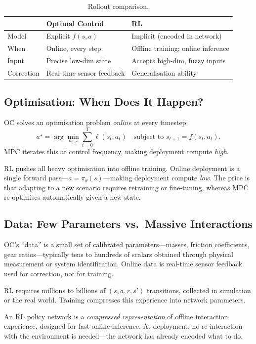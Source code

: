 \begin{table}[htbp]
\centering
\caption{Rollout comparison.}
\begin{tabular}{@{}lll@{}}
\toprule
& \textbf{Optimal Control} & \textbf{RL} \\
\midrule
Model & Explicit $f(s,a)$ & Implicit (encoded in network) \\
When & Online, every step & Offline training; online inference \\
Input & Precise low-dim state & Accepts high-dim, fuzzy inputs \\
Correction & Real-time sensor feedback & Generalisation ability \\
\bottomrule
\end{tabular}
\end{table}

\subsection{Optimisation: When Does It Happen?}

OC solves an optimisation problem \emph{online} at every timestep:
\[
  a^\star = \arg\min_{a_{0:T}} \sum_{t=0}^{T} \ell(s_t, a_t)
  \quad\text{subject to } s_{t+1}=f(s_t,a_t).
\]
MPC iterates this at control frequency, making deployment compute \emph{high}.

RL pushes all heavy optimisation into offline training.
Online deployment is a single forward pass---$a = \pi_\theta(s)$---making deployment compute \emph{low}.
The price is that adapting to a new scenario requires retraining or fine-tuning, whereas MPC re-optimises automatically given a new state.

\subsection{Data: Few Parameters vs.\ Massive Interactions}

OC's ``data'' is a small set of calibrated parameters---masses, friction coefficients, gear ratios---typically tens to hundreds of scalars obtained through physical measurement or system identification.
Online data is real-time sensor feedback used for correction, not for training.

RL requires millions to billions of $(s,a,r,s')$ transitions, collected in simulation or the real world.
Training compresses this experience into network parameters.

\begin{keyidea}[RL Model = Compressed Offline Experience]
An RL policy network is a \emph{compressed representation} of offline interaction experience, designed for fast online inference.
At deployment, no re-interaction with the environment is needed---the network has already encoded what to do.
\end{keyidea}

